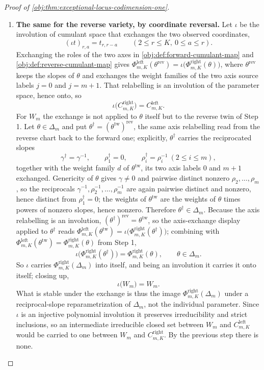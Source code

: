 \documentclass[11pt]{article}
\begin{document}
\begin{proof}[Proof of \cref{obj:thm:exceptional-locus-codimension-one}]
\begin{enumerate}
\item \textbf{The same for the reverse variety, by coordinate reversal.}  Let \(\iota\) be the involution of cumulant space that exchanges the two observed coordinates,
\[
(\iota t)_{r,a}=t_{r,r-a}
\qquad (2\le r\le K,\ 0\le a\le r).
\]
Exchanging the roles of the two axes in \cref{obj:def:forward-cumulant-map} and \cref{obj:def:reverse-cumulant-map} gives \(\Phi^{\mathrm{left}}_{m,K}(\theta^{\mathrm{rev}})=\iota\bigl(\Phi^{\mathrm{right}}_{m,K}(\theta)\bigr)\), where \(\theta^{\mathrm{rev}}\) keeps the slopes of \(\theta\) and exchanges the weight families of the two axis source labels \(j=0\) and \(j=m+1\).  That relabelling is an involution of the parameter space, hence onto, so
\[
\iota\bigl(C^{\mathrm{right}}_{m,K}\bigr)=C^{\mathrm{left}}_{m,K}.
\]
For \(W_m\) the exchange is not applied to \(\theta\) itself but to the reverse twin of Step 1.  Let \(\theta\in\Delta_m\) and put \(\theta^{\dagger}=(\theta^{\mathrm{tw}})^{\mathrm{rev}}\), the same axis relabelling read from the reverse chart back to the forward one; explicitly, \(\theta^{\dagger}\) carries the reciprocated slopes
\[
\gamma^{\dagger}=\gamma^{-1},
\qquad
\rho^{\dagger}_1=0,
\qquad
\rho^{\dagger}_i=\rho_i^{-1}\ (2\le i\le m),
\]
together with the weight family \(d\) of \(\theta^{\mathrm{tw}}\), its two axis labels \(0\) and \(m+1\) exchanged.  Genericity of \(\theta\) gives \(\gamma\ne0\) and pairwise distinct nonzero \(\rho_2,\ldots,\rho_m\), so the reciprocals \(\gamma^{-1},\rho_2^{-1},\ldots,\rho_m^{-1}\) are again pairwise distinct and nonzero, hence distinct from \(\rho^{\dagger}_1=0\); the weights of \(\theta^{\mathrm{tw}}\) are the weights of \(\theta\) times powers of nonzero slopes, hence nonzero.  Therefore \(\theta^{\dagger}\in\Delta_m\).  Because the axis relabelling is an involution, \((\theta^{\dagger})^{\mathrm{rev}}=\theta^{\mathrm{tw}}\), so the axis-exchange display applied to \(\theta^{\dagger}\) reads \(\Phi^{\mathrm{left}}_{m,K}(\theta^{\mathrm{tw}})=\iota\bigl(\Phi^{\mathrm{right}}_{m,K}(\theta^{\dagger})\bigr)\); combining with \(\Phi^{\mathrm{left}}_{m,K}(\theta^{\mathrm{tw}})=\Phi^{\mathrm{right}}_{m,K}(\theta)\) from Step 1,
\[
\iota\bigl(\Phi^{\mathrm{right}}_{m,K}(\theta^{\dagger})\bigr)=\Phi^{\mathrm{right}}_{m,K}(\theta),
\qquad\theta\in\Delta_m .
\]
So \(\iota\) carries \(\Phi^{\mathrm{right}}_{m,K}(\Delta_m)\) into itself, and being an involution it carries it onto itself; closing up,
\[
\iota\bigl(W_m\bigr)=W_m .
\]
What is stable under the exchange is thus the image \(\Phi^{\mathrm{right}}_{m,K}(\Delta_m)\) under a reciprocal-slope reparametrization of \(\Delta_m\), not the individual parameter.  Since \(\iota\) is an injective polynomial involution it preserves irreducibility and strict inclusions, so an intermediate irreducible closed set between \(W_m\) and \(C^{\mathrm{left}}_{m,K}\) would be carried to one between \(W_m\) and \(C^{\mathrm{right}}_{m,K}\).  By the previous step there is none.

\end{enumerate}
\end{proof}
\end{document}
